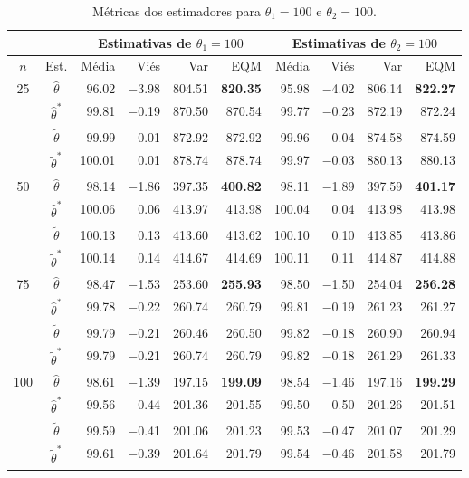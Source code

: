 \documentclass[12pt]{article}
\theoremstyle{definition}
\begin{document}
\begin{table}[htbp]
\centering
\begin{tabular}{c|c|rrrr|rrrr}
 \multicolumn{2}{c}{} & \multicolumn{4}{|c|}{Estimativas de $\theta_1=100$} &  \multicolumn{4}{c}{Estimativas de $\theta_2=100$} \\
  \hline
 $n$ & Est. & Média & Viés & Var & EQM & Média & Viés & Var & EQM \\ 
  \hline
    25 & $\hat{\theta}$ & 96.02 & $-$3.98 & 804.51 & \textbf{820.35} & 95.98 & $-$4.02 & 806.14 & \textbf{822.27} \\ 
        & $\hat{\theta}^*$ & 99.81 & $-$0.19 & 870.50 & 870.54 & 99.77 & $-$0.23 & 872.19 & 872.24 \\ 
        & $\tilde{\theta}$ & 99.99 & $-$0.01 & 872.92 & 872.92 & 99.96 & $-$0.04 & 874.58 & 874.59 \\ 
        & $\tilde{\theta}^*$ & 100.01 & 0.01 & 878.74 & 878.74 & 99.97 & $-$0.03 & 880.13 & 880.13 \\ 
  
   \hline
    50 & $\hat{\theta}$ & 98.14 & $-$1.86 & 397.35 & \textbf{400.82} & 98.11 & $-$1.89 & 397.59 & \textbf{401.17} \\ 
        & $\hat{\theta}^*$ & 100.06 & 0.06 & 413.97 & 413.98 & 100.04 & 0.04 & 413.98 & 413.98 \\ 
        & $\tilde{\theta}$ & 100.13 & 0.13 & 413.60 & 413.62 & 100.10 & 0.10 & 413.85 & 413.86 \\ 
        & $\tilde{\theta}^*$ & 100.14 & 0.14 & 414.67 & 414.69 & 100.11 & 0.11 & 414.87 & 414.88 \\

    \hline
    75 & $\hat{\theta}$ & 98.47 & $-$1.53 & 253.60 & \textbf{255.93} & 98.50 & $-$1.50 & 254.04 & \textbf{256.28} \\ 
        & $\hat{\theta}^*$ & 99.78 & $-$0.22 & 260.74 & 260.79 & 99.81 & $-$0.19 & 261.23 & 261.27 \\ 
        & $\tilde{\theta}$ & 99.79 & $-$0.21 & 260.46 & 260.50 & 99.82 & $-$0.18 & 260.90 & 260.94 \\ 
        & $\tilde{\theta}^*$ & 99.79 & $-$0.21 & 260.74 & 260.79 & 99.82 & $-$0.18 & 261.29 & 261.33 \\ 

    \hline
    100 & $\hat{\theta}$ & 98.61 & $-$1.39 & 197.15 & \textbf{199.09} & 98.54 & $-$1.46 & 197.16 & \textbf{199.29} \\ 
        & $\hat{\theta}^*$ & 99.56 & $-$0.44 & 201.36 & 201.55 & 99.50 & $-$0.50 & 201.26 & 201.51 \\ 
        & $\tilde{\theta}$ & 99.59 & $-$0.41 & 201.06 & 201.23 & 99.53 & $-$0.47 & 201.07 & 201.29 \\ 
        & $\tilde{\theta}^*$ & 99.61 & $-$0.39 & 201.64 & 201.79 & 99.54 & $-$0.46 & 201.58 & 201.79 \\
    \hline
\end{tabular}
\caption{Métricas dos estimadores para $\theta_1 = 100$ e $\theta_2 = 100$.}
\label{tab:100x100}
\end{table}
\end{document}
